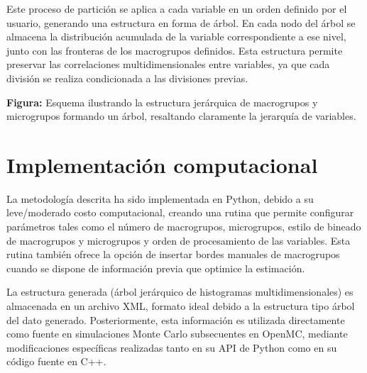 Este proceso de partición se aplica a cada variable en un orden definido por el usuario, generando una estructura en forma de árbol. En cada nodo del árbol se almacena la distribución acumulada de la variable correspondiente a ese nivel, junto con las fronteras de los macrogrupos definidos. Esta estructura permite preservar las correlaciones multidimensionales entre variables, ya que cada división se realiza condicionada a las divisiones previas.




\textbf{Figura:} Esquema ilustrando la estructura jerárquica de macrogrupos y microgrupos formando un árbol, resaltando claramente la jerarquía de variables.

\section{Implementación computacional}
La metodología descrita ha sido implementada en Python, debido a su leve/moderado costo computacional, creando una rutina que permite configurar parámetros tales como el número de macrogrupos, microgrupos, estilo de bineado de macrogrupos y microgrupos y orden de procesamiento de las variables. Esta rutina también ofrece la opción de insertar bordes manuales de macrogrupos cuando se dispone de información previa que optimice la estimación.

La estructura generada (árbol jerárquico de histogramas multidimensionales) es almacenada en un archivo XML, formato ideal debido a la estructura tipo árbol del dato generado. Posteriormente, esta información es utilizada directamente como fuente en simulaciones Monte Carlo subsecuentes en OpenMC, mediante modificaciones específicas realizadas tanto en su API de Python como en su código fuente en C++.


